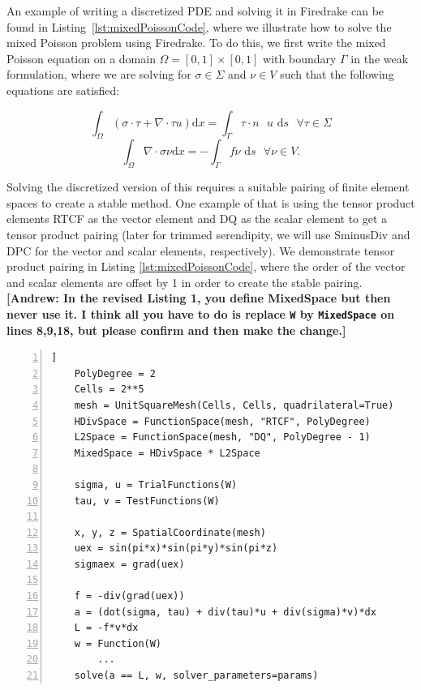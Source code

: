 \documentclass[manuscript,screen]{acmart}
\newcommand\akg[1]{\textbf{\textcolor[rgb]{.5,0,1}{[Andrew: #1]}}}
\begin{document}
An example of writing a discretized PDE and solving it in Firedrake can be found in Listing~\ref{lst:mixedPoissonCode}, where we illustrate how to solve the mixed Poisson problem using Firedrake.  To do this, we first write the mixed Poisson equation on a domain $\Omega = [0, 1] \times [0,1]$ with boundary $\Gamma$ in the weak formulation, where we are solving for $\sigma \in \Sigma$ and $\nu \in V$ such that the following equations are satisfied:

\begin{equation*}
    \int_\Omega (\sigma \cdot \tau + \nabla \cdot \tau u) \text{d}x = \int_\Gamma \tau \cdot n \text{ } u \text{ d}s \text{  } \forall \tau \in \Sigma
\end{equation*}
\begin{equation*}
    \int_\Omega  \nabla \cdot \sigma \nu \text{d}x = - \int_\Gamma f \nu \text{ d}s \text{  } \forall \nu \in V.
\end{equation*}
  
\noindent Solving the discretized version of this requires a suitable pairing of finite element spaces to create a stable method.  One example of that is using the tensor product elements {\selectfont RTCF} as the vector element and {\selectfont DQ} as the scalar element to get a tensor product pairing (later for trimmed serendipity, we will use {\selectfont SminusDiv} and {\selectfont DPC} for the vector and scalar elements, respectively).  We demonstrate tensor product pairing in Listing \ref{lst:mixedPoissonCode}, where the order of the vector and scalar elements are offset by 1 in order to create the stable pairing. 
\akg{In the revised Listing 1, you define MixedSpace but then never use it.  I think all you have to do is replace \texttt{W} by \texttt{MixedSpace} on lines 8,9,18, but please confirm and then make the change.}
  
  \lstset{language=Python}
  \lstset{basicstyle=\footnotesize\ttfamily,breaklines=true}
  \begin{lstlisting}[frame=single, caption={Basic Firedrake implementation of the mixed Poisson problem showcasing where to choose the elements that are used and how to create the equations in Firedrake's notation.}, label={lst:mixedPoissonCode}, numbers=left, firstnumber=1, xleftmargin=20pt, xrightmargin=20pt]]
    PolyDegree = 2
    Cells = 2**5
    mesh = UnitSquareMesh(Cells, Cells, quadrilateral=True)
    HDivSpace = FunctionSpace(mesh, "RTCF", PolyDegree)
    L2Space = FunctionSpace(mesh, "DQ", PolyDegree - 1)
    MixedSpace = HDivSpace * L2Space
    
    sigma, u = TrialFunctions(W)
    tau, v = TestFunctions(W)
    
    x, y, z = SpatialCoordinate(mesh)
    uex = sin(pi*x)*sin(pi*y)*sin(pi*z)
    sigmaex = grad(uex)
    
    f = -div(grad(uex))
    a = (dot(sigma, tau) + div(tau)*u + div(sigma)*v)*dx
    L = -f*v*dx
    w = Function(W)
        ...
    solve(a == L, w, solver_parameters=params)
  \end{lstlisting}
\end{document}
